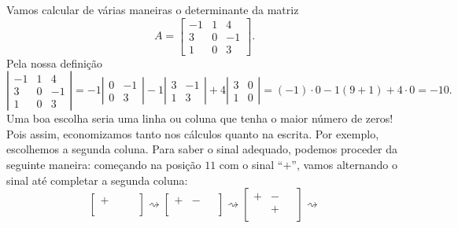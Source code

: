 \begin{ex}
Vamos calcular de várias maneiras o determinante da matriz
\begin{equation}
A =
\begin{bmatrix}
-1 & 1 & 4 \\
 3 & 0 & -1 \\
 1 & 0 & 3
\end{bmatrix}.
\end{equation} Pela nossa definição
\begin{equation}
\left|
\begin{matrix}
-1 & 1 & 4 \\
3 & 0 & -1 \\
1 & 0 & 3
\end{matrix}
\right| =
-1 \left|
\begin{matrix}
 0 & -1 \\
 0 & 3
\end{matrix}
\right| - 1 \left|
\begin{matrix}
3  & -1 \\
1  & 3
\end{matrix}
\right| + 4
\left|
\begin{matrix}
3 & 0  \\
1 & 0
\end{matrix}
\right| = (-1)\cdot 0 - 1 (9 + 1) + 4 \cdot 0 = -10.
\end{equation} Uma boa escolha seria uma linha ou coluna que tenha o maior número de zeros! Pois assim, economizamos tanto nos cálculos quanto na escrita. Por exemplo, escolhemos a segunda coluna. Para saber o sinal adequado, podemos proceder da seguinte maneira: começando na posição $11$ com o sinal ``$+$'', vamos alternando o sinal até completar a segunda coluna:
\begin{equation}
\begin{bmatrix}
+ & \,\,  & \,\,  \\
  &  &   \\
  &  &
\end{bmatrix} \rightsquigarrow
\begin{bmatrix}
+ & - & \,\,  \\
\,\,& \,\, & \,\,  \\
\,\,& \,\, &  \,\,
\end{bmatrix}\rightsquigarrow
\begin{bmatrix}
+ & - & \,\,  \\
& + & \,\,  \\
\,\,& \,\, &  \,\,
\end{bmatrix} \rightsquigarrow

\end{equation}
\end{ex}
